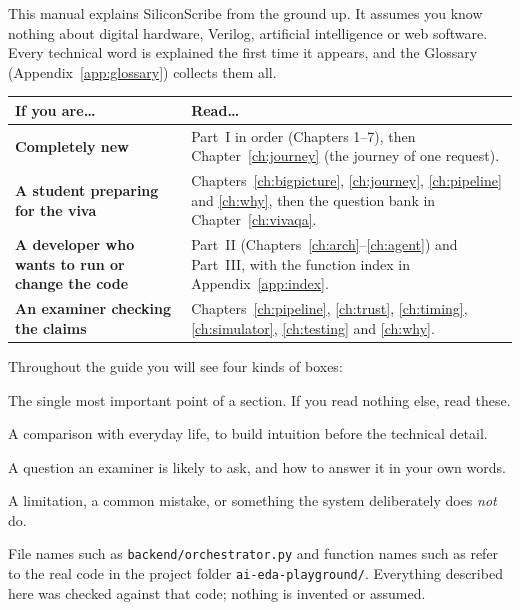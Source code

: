 \documentclass[11pt,a4paper,oneside]{report}
\newcommand{\code}[1]{\texttt{\detokenize{#1}}}
\newcommand{\file}[1]{\nolinkurl{#1}}
\begin{document}
This manual explains SiliconScribe from the ground up. It assumes you know nothing about digital hardware, Verilog, artificial intelligence or web software. Every technical word is explained the first time it appears, and the Glossary (Appendix~\ref{app:glossary}) collects them all.

\begin{center}
\begin{tabularx}{\textwidth}{@{}>{\bfseries}p{4.1cm}X@{}}
\toprule
If you are\ldots & Read\ldots \\
\midrule
Completely new & Part~I in order (Chapters 1--7), then Chapter~\ref{ch:journey} (the journey of one request). \\
A student preparing for the viva & Chapters~\ref{ch:bigpicture}, \ref{ch:journey}, \ref{ch:pipeline} and \ref{ch:why}, then the question bank in Chapter~\ref{ch:vivaqa}. \\
A developer who wants to run or change the code & Part~II (Chapters~\ref{ch:arch}--\ref{ch:agent}) and Part~III, with the function index in Appendix~\ref{app:index}. \\
An examiner checking the claims & Chapters~\ref{ch:pipeline}, \ref{ch:trust}, \ref{ch:timing}, \ref{ch:simulator}, \ref{ch:testing} and \ref{ch:why}. \\
\bottomrule
\end{tabularx}
\end{center}

Throughout the guide you will see four kinds of boxes:

\begin{keyidea}
The single most important point of a section. If you read nothing else, read these.
\end{keyidea}
\begin{analogy}
A comparison with everyday life, to build intuition before the technical detail.
\end{analogy}
\begin{viva}
A question an examiner is likely to ask, and how to answer it in your own words.
\end{viva}
\begin{warnbox}
A limitation, a common mistake, or something the system deliberately does \emph{not} do.
\end{warnbox}

File names such as \file{backend/orchestrator.py} and function names such as \code{pipeline_events} refer to the real code in the project folder \file{ai-eda-playground/}. Everything described here was checked against that code; nothing is invented or assumed.
\end{document}
